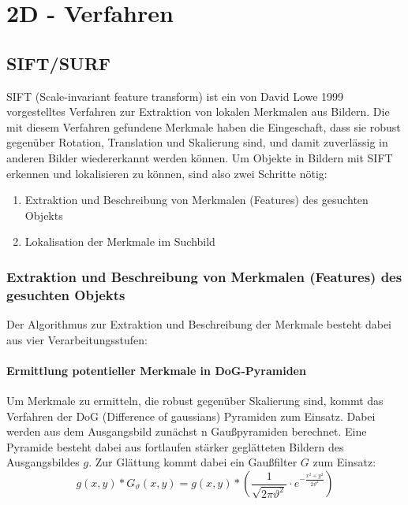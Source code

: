 
\chapter{2D - Verfahren}
\label{chap:2d}
	\section{SIFT/SURF}
		SIFT (Scale-invariant feature transform) ist ein von David Lowe 1999 vorgestelltes Verfahren zur Extraktion von lokalen Merkmalen aus Bildern. Die mit diesem Verfahren gefundene Merkmale haben die Eingeschaft, dass sie robust gegenüber Rotation, Translation und Skalierung sind, und damit zuverlässig in anderen Bilder wiedererkannt werden können.
Um Objekte in Bildern mit SIFT erkennen und lokalisieren zu können, sind also zwei Schritte nötig:
\begin{enumerate}
	\item Extraktion und Beschreibung von Merkmalen (Features) des gesuchten Objekts
	\item Lokalisation der Merkmale im Suchbild
\end{enumerate}

\subsection{Extraktion und Beschreibung von Merkmalen (Features) des gesuchten Objekts}
Der Algorithmus zur Extraktion und Beschreibung der Merkmale besteht dabei aus vier Verarbeitungsstufen:
	\subsubsection{Ermittlung potentieller Merkmale in DoG-Pyramiden}
		Um Merkmale zu ermitteln, die robust gegenüber Skalierung sind, kommt das Verfahren der DoG (Difference of gaussians) Pyramiden zum Einsatz. Dabei werden aus dem Ausgangsbild zunächst n Gaußpyramiden berechnet. Eine Pyramide besteht dabei aus fortlaufen stärker geglätteten Bildern des Ausgangsbildes $g$. Zur Glättung kommt dabei ein Gaußfilter $G$ zum Einsatz:
\begin{equation*}
 g(x, y) * G_\vartheta (x, y) = g(x, y) * (\frac{1}{\sqrt{2\pi \vartheta ^2}}\cdot e^{-\frac{x^2 + y^2}{2\vartheta ^2}})
\end{equation*}

